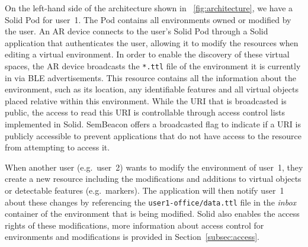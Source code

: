 On the left-hand side of the architecture shown in \figurename~\ref{fig:architecture}, we have a Solid Pod for user~1. The Pod contains all environments owned or modified by the user. An AR device connects to the user's Solid Pod through a Solid application that authenticates the user, allowing it to modify the resources when editing a virtual environment. In order to enable the discovery of these virtual spaces, the AR device broadcasts the \texttt{*.ttl} file of the environment it is currently in via BLE advertisements. This resource contains all the information about the environment, such as its location, any identifiable features and all virtual objects placed relative within this environment. While the URI that is broadcasted is public, the access to read this URI is controllable through access control lists implemented in Solid. SemBeacon offers a broadcasted flag to indicate if a URI is publicly accessible to prevent applications that do not have access to the resource from attempting to access it.

When another user (e.g.~user~2) wants to modify the environment of user~1, they create a new resource including the modifications and additions to virtual objects or detectable features (e.g.~markers). The application will then notify user~1 about these changes by referencing the \texttt{user1-office/data.ttl} file in the \emph{inbox}~\cite{10.1007/978-3-319-58068-5_33} container of the environment that is being modified. Solid also enables the access rights of these modifications, more information about access control for environments and modifications is provided in Section~\ref{subsec:access}.

